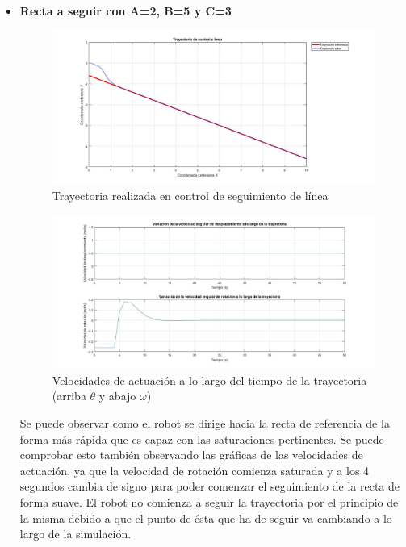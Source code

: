 \documentclass[a4paper,twoside]{article}
\begin{document}
	\begin{itemize}
		\item \textbf{Recta a seguir con A=2, B=5 y C=3}
		\begin{figure}[h!]
			\centering
			\includegraphics[width=1\textwidth]{control_linea_1}
			\caption{Trayectoria realizada en control de seguimiento de línea}
		\end{figure}
		\begin{figure}[h!]
			\centering
			\includegraphics[width=1\textwidth]{control_linea_1_2}
			\caption{Velocidades de actuación a lo largo del tiempo de la trayectoria (arriba $\dot{\theta}$ y abajo $\omega$)}
		\end{figure}
	Se puede observar como el robot se dirige hacia la recta de referencia de la forma más rápida que es capaz con las saturaciones pertinentes. Se puede comprobar esto también observando las gráficas de las velocidades de actuación, ya que la velocidad de rotación comienza saturada y a los 4 segundos cambia de signo para poder comenzar el seguimiento de la recta de forma suave. El robot no comienza a seguir la trayectoria por el principio de la misma debido a que el punto de ésta que ha de seguir va cambiando a lo largo de la simulación.\\
	

\end{itemize}
\end{document}
